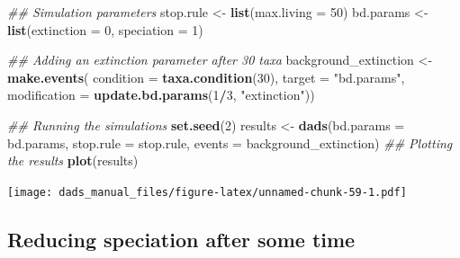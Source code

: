 \documentclass[]{book}
\newenvironment{Shaded}{\begin{snugshade}}{\end{snugshade}}
\newcommand{\CommentTok}[1]{\textcolor[rgb]{0.56,0.35,0.01}{\textit{#1}}}
\newcommand{\DataTypeTok}[1]{\textcolor[rgb]{0.13,0.29,0.53}{#1}}
\newcommand{\DecValTok}[1]{\textcolor[rgb]{0.00,0.00,0.81}{#1}}
\newcommand{\KeywordTok}[1]{\textcolor[rgb]{0.13,0.29,0.53}{\textbf{#1}}}
\newcommand{\NormalTok}[1]{#1}
\newcommand{\OperatorTok}[1]{\textcolor[rgb]{0.81,0.36,0.00}{\textbf{#1}}}
\newcommand{\StringTok}[1]{\textcolor[rgb]{0.31,0.60,0.02}{#1}}
\begin{document}
\begin{Shaded}
\begin{Highlighting}[]
\CommentTok{## Simulation parameters}
\NormalTok{stop.rule <-}\StringTok{ }\KeywordTok{list}\NormalTok{(}\DataTypeTok{max.living =} \DecValTok{50}\NormalTok{)}
\NormalTok{bd.params <-}\StringTok{ }\KeywordTok{list}\NormalTok{(}\DataTypeTok{extinction =} \DecValTok{0}\NormalTok{, }\DataTypeTok{speciation =} \DecValTok{1}\NormalTok{)}

\CommentTok{## Adding an extinction parameter after 30 taxa}
\NormalTok{background_extinction <-}\StringTok{ }\KeywordTok{make.events}\NormalTok{(}
                      \DataTypeTok{condition    =} \KeywordTok{taxa.condition}\NormalTok{(}\DecValTok{30}\NormalTok{),}
                      \DataTypeTok{target       =} \StringTok{"bd.params"}\NormalTok{,}
                      \DataTypeTok{modification =} \KeywordTok{update.bd.params}\NormalTok{(}\DecValTok{1}\OperatorTok{/}\DecValTok{3}\NormalTok{, }\StringTok{"extinction"}\NormalTok{))}

\CommentTok{## Running the simulations}
\KeywordTok{set.seed}\NormalTok{(}\DecValTok{2}\NormalTok{)}
\NormalTok{results <-}\StringTok{ }\KeywordTok{dads}\NormalTok{(}\DataTypeTok{bd.params =}\NormalTok{ bd.params,}
                \DataTypeTok{stop.rule =}\NormalTok{ stop.rule,}
                \DataTypeTok{events    =}\NormalTok{ background_extinction)}
\CommentTok{## Plotting the results}
\KeywordTok{plot}\NormalTok{(results)}
\end{Highlighting}
\end{Shaded}

\texttt{[image: dads\_manual\_files/figure-latex/unnamed-chunk-59-1.pdf]}

\hypertarget{reducing-speciation-after-some-time}{%
\subsection{Reducing speciation after some time}\label{reducing-speciation-after-some-time}}
\end{document}
